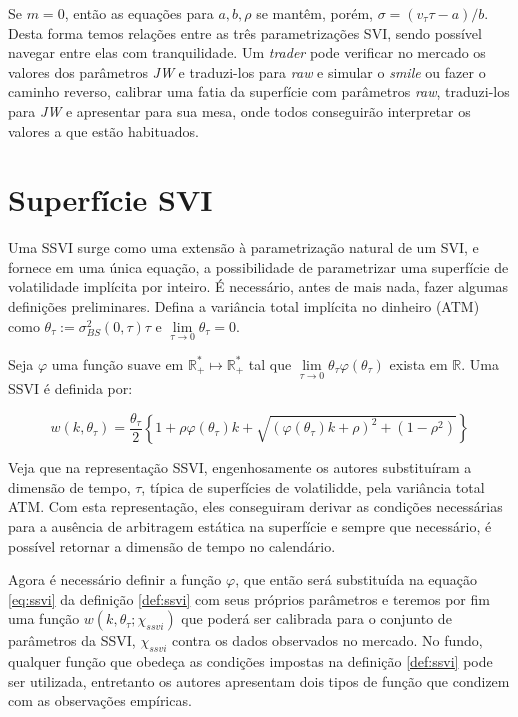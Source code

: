 \documentclass[]{book}
\theoremstyle{definition}
\theoremstyle{definition}
\theoremstyle{definition}
\theoremstyle{remark}
\let\BeginKnitrBlock\begin \let\EndKnitrBlock\end
\begin{document}
Se \(m=0\), então as equações para \(a, b, \rho\) se mantêm, porém, \(\sigma = (v_\tau \tau-a)/b\). Desta forma temos relações entre as três parametrizações SVI, sendo possível navegar entre elas com tranquilidade. Um \emph{trader} pode verificar no mercado os valores dos parâmetros \emph{JW} e traduzi-los para \emph{raw} e simular o \emph{smile} ou fazer o caminho reverso, calibrar uma fatia da superfície com parâmetros \emph{raw}, traduzi-los para \emph{JW} e apresentar para sua mesa, onde todos conseguirão interpretar os valores a que estão habituados.

\hypertarget{superficie-svi}{%
\section{Superfície SVI}\label{superficie-svi}}

Uma SSVI surge como uma extensão à parametrização natural de um SVI, e fornece em uma única equação, a possibilidade de parametrizar uma superfície de volatilidade implícita por inteiro. É necessário, antes de mais nada, fazer algumas definições preliminares. Defina a variância total implícita no dinheiro (ATM) como \(\theta_\tau:=\sigma_{BS}^2(0, \tau)\tau\) e \(\lim\limits_{\tau\rightarrow 0}\theta_\tau = 0\).

\BeginKnitrBlock{definition}
\protect\hypertarget{def:ssvi}{}{\label{def:ssvi} }Seja \(\varphi\) uma função suave em \(\mathbb R_+^*\mapsto \mathbb R_+^*\) tal que \(\lim\limits_{\tau\rightarrow 0}\theta_\tau \varphi(\theta_\tau)\) exista em \(\mathbb R\). Uma SSVI é definida por:
\EndKnitrBlock{definition}

\begin{equation}
w(k, \theta_\tau)=\frac{\theta_\tau}{2}\left\lbrace 1+\rho\varphi(\theta_\tau)k+\sqrt{(\varphi(\theta_\tau)k+\rho)^2+(1-\rho^2)} \right\rbrace
\label{eq:ssvi}
\end{equation}

Veja que na representação SSVI, engenhosamente os autores substituíram a dimensão de tempo, \(\tau\), típica de superfícies de volatilidde, pela variância total ATM. Com esta representação, eles conseguiram derivar as condições necessárias para a ausência de arbitragem estática na superfície e sempre que necessário, é possível retornar a dimensão de tempo no calendário.

Agora é necessário definir a função \(\varphi\), que então será substituída na equação \eqref{eq:ssvi} da definição \ref{def:ssvi} com seus próprios parâmetros e teremos por fim uma função \(w(k, \theta_\tau; \chi_{ssvi})\) que poderá ser calibrada para o conjunto de parâmetros da SSVI, \(\chi_{ssvi}\) contra os dados observados no mercado. No fundo, qualquer função que obedeça as condições impostas na definição \ref{def:ssvi} pode ser utilizada, entretanto os autores apresentam dois tipos de função que condizem com as observações empíricas.
\end{document}
